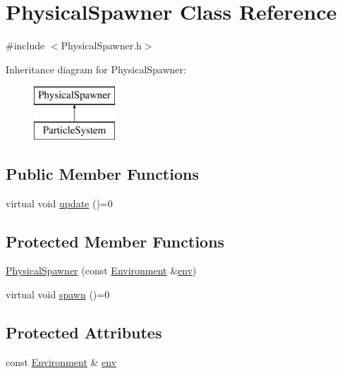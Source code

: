 \hypertarget{class_physical_spawner}{\section{Physical\-Spawner Class Reference}
\label{class_physical_spawner}
}


{\ttfamily \#include $<$Physical\-Spawner.\-h$>$}

Inheritance diagram for Physical\-Spawner\-:\begin{figure}[H]
\begin{center}
\leavevmode
\includegraphics[height=2.000000cm]{class_physical_spawner}
\end{center}
\end{figure}
\subsection*{Public Member Functions}
\begin{DoxyCompactItemize}
\item 
virtual void \hyperlink{class_physical_spawner_a9794957b6ec18278864428319809fb93}{update} ()=0
\end{DoxyCompactItemize}
\subsection*{Protected Member Functions}
\begin{DoxyCompactItemize}
\item 
\hyperlink{class_physical_spawner_a92f9dd08461e4bdc5c3de417c7213f14}{Physical\-Spawner} (const \hyperlink{class_environment}{Environment} \&\hyperlink{class_physical_spawner_a57664efe7795d64b6d009b30b74d2c91}{env})
\item 
virtual void \hyperlink{class_physical_spawner_a2459aa5efc6e82125bdd21c562cc1b77}{spawn} ()=0
\end{DoxyCompactItemize}
\subsection*{Protected Attributes}
\begin{DoxyCompactItemize}
\item 
const \hyperlink{class_environment}{Environment} \& \hyperlink{class_physical_spawner_a57664efe7795d64b6d009b30b74d2c91}{env}
\end{DoxyCompactItemize}


